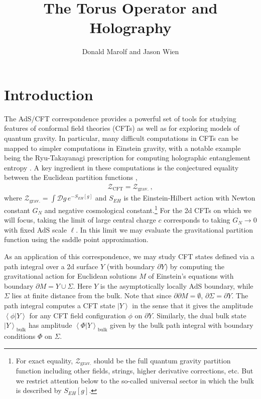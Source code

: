\documentclass[letterpaper,12pt]{article}
\title{The Torus Operator and Holography}
\author{Donald Marolf and Jason Wien}
\affiliation{Department of Physics, University of California, Santa Barbara, CA 93106, USA}
\newcommand{\ban}[1]{\begin{align}#1\end{align}}
\newcommand{\corr}[1]{\left< #1\right>}
\newcommand{\ket}[1]{\left| #1\right>}
\begin{document}
\maketitle

\section{Introduction}
\label{section:intro}

The AdS/CFT correspondence \cite{maldholo, wittenholo} provides a powerful set of tools for studying features of conformal field theories (CFTs) as well as for exploring models of quantum gravity. In particular, many difficult computations in CFTs can be mapped to simpler computations in Einstein gravity, with a notable example being the Ryu-Takayanagi prescription for computing holographic entanglement entropy \cite{rt1, rt2}. A key ingredient in these computations is the conjectured equality between the Euclidean partition functions \cite{GKP},
\ban{
\mathcal Z_\text{CFT} = \mathcal Z_\text{grav.}\, ,
}
where $\mathcal Z_\text{grav.} = \int \mathcal D g\, e^{-S_{EH}[g]}$ and $S_{EH}$ is the Einstein-Hilbert action with Newton constant $G_N$ and negative cosmological constant.\footnote{For exact equality, $\mathcal Z_\text{grav.}$ should be the full quantum gravity partition function including other fields, strings, higher derivative corrections, etc. But we restrict attention below to the so-called universal sector in which the bulk is described by $S_{EH}[g]$.} For the 2d CFTs on which we will focus, taking the limit of large central charge $c$ corresponds to taking $G_N \to 0$ with fixed AdS scale $\ell$. In this limit we may evaluate the gravitational partition function using the saddle point approximation.

As an application of this correspondence, we may study CFT states defined via a path integral over a 2d surface ${Y}$ (with boundary $\partial {Y}$) by computing the gravitational action for Euclidean solutions $M$ of Einstein's equations with boundary $\partial M ={Y} \cup \Sigma $. Here ${Y}$ is the asymptotically locally AdS boundary, while $\Sigma$ lies at finite distance from the bulk. Note that since $\partial \partial M = \emptyset$, $\partial \Sigma = \partial {Y}$. The path integral computes a CFT state $\ket {Y}$ in the sense that it gives the amplitude $\corr{\phi|{Y}}$ for any CFT field configuration $\phi$ on $\partial {Y}$. Similarly, the dual bulk state $\ket {Y}_\text{bulk}$ has amplitude $\corr{\Phi|{Y}}_\text{bulk}$ given by the bulk path integral with boundary conditions $\Phi$ on $\Sigma$.
\end{document}
